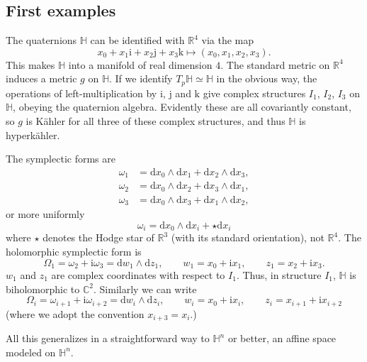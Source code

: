 \documentclass[12pt,letterpaper,reqno]{amsart}
\numberwithin{equation}{section}
\newcommand{\R}{\ensuremath{\mathbb R}}
\newcommand{\C}{\ensuremath{\mathbb C}}
\newcommand{\bbH}{\ensuremath{\mathbb H}}
\newcommand{\kahler}{K\"ahler\xspace}
\newcommand{\hk}{hyperk\"ahler\xspace}
\newcommand{\I}{{\mathrm i}}
\newcommand{\J}{{\mathrm j}}
\newcommand{\K}{{\mathrm k}}
\newcommand{\de}{\mathrm{d}}
\begin{document}
\subsection{First examples}

\begin{example} \label{exa:R4} The quaternions
$\bbH$ can be identified with $\R^4$
via the map
\begin{equation}
  x_0 + x_1 \I + x_2 \J + x_3 \K \mapsto (x_0,x_1,x_2,x_3).
\end{equation}
This makes $\bbH$ into a manifold of real 
dimension $4$.
The standard metric on $\R^4$ induces a metric
$g$ on $\bbH$.
If we identify $T_p \bbH \simeq \bbH$ 
in the obvious way,
the operations of left-multiplication by $\I$, $\J$ and $\K$
give complex structures $I_1$, $I_2$, $I_3$ on $\bbH$,
obeying the quaternion algebra.
Evidently these are all covariantly constant, so
$g$ is \kahler for all three of these complex
structures, and thus $\bbH$ is \hk.

The symplectic forms are
\begin{align}
  \omega_1 &= \de x_0 \wedge \de x_1 + \de x_2 \wedge \de x_3, \\
  \omega_2 &= \de x_0 \wedge \de x_2 + \de x_3 \wedge \de x_1, \\
  \omega_3 &= \de x_0 \wedge \de x_3 + \de x_1 \wedge \de x_2,
\end{align}
or more uniformly
\begin{equation} \label{eq:symplectic-forms-R4}
  \omega_i = \de x_0 \wedge \de x_i + \star \de x_i
\end{equation}
where $\star$ denotes the Hodge star of $\R^3$ (with its 
standard orientation), not $\R^4$.
The holomorphic symplectic form is
\begin{equation}
  \Omega_1 = \omega_2 + \I \omega_3 = \de w_1 \wedge \de z_1, \qquad w_1 = x_0 + \I x_1, \qquad z_1 = x_2 + \I x_3.
\end{equation}
$w_1$ and $z_1$ are complex coordinates with respect to $I_1$.
Thus, in structure $I_1$, $\bbH$ is biholomorphic to $\C^2$.
Similarly we can write
\begin{equation} \label{eq:Omega-i-R4}
  \Omega_i = \omega_{i+1} + \I \omega_{i+2} = \de w_i \wedge \de z_i, \qquad w_i = x_0 + \I x_i, \qquad z_i = x_{i+1} + \I x_{i+2}
\end{equation}
(where we adopt the convention $x_{i+3} = x_i$.)

All this generalizes in a straightforward way to $\bbH^n$ 
or better, an affine space modeled on $\bbH^n$.
\end{example}
\end{document}
